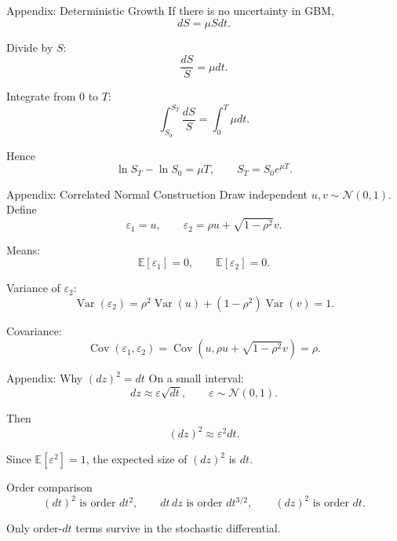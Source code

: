 \documentclass[aspectratio=169,11pt]{beamer}
\newcommand{\eps}{\varepsilon}
\newcommand{\E}{\mathbb{E}}
\newcommand{\Var}{\operatorname{Var}}
\newcommand{\Cov}{\operatorname{Cov}}
\newcommand{\Normal}{\mathcal{N}}
\begin{document}
\begin{frame}[label=deriv_gbm_no_uncertainty]{Appendix: Deterministic Growth}
    If there is no uncertainty in GBM,
    \[
        dS=\mu Sdt.
    \]

    Divide by \(S\):
    \[
        \frac{dS}{S}=\mu dt.
    \]

    Integrate from 0 to \(T\):
    \[
        \int_{S_0}^{S_T}\frac{dS}{S}
        =
        \int_0^T \mu dt.
    \]

    Hence
    \[
        \ln S_T-\ln S_0=\mu T,
        \qquad
        S_T=S_0e^{\mu T}.
    \]

    \hyperlink{gbm_main}{}
\end{frame}

\begin{frame}[label=deriv_correlated_normals]{Appendix: Correlated Normal Construction}
    Draw independent \(u,v\sim\Normal(0,1)\). Define
    \[
        \eps_1=u,
        \qquad
        \eps_2=\rho u+\sqrt{1-\rho^2}v.
    \]

    Means:
    \[
        \E[\eps_1]=0,
        \qquad
        \E[\eps_2]=0.
    \]

    Variance of \(\eps_2\):
    \[
        \Var(\eps_2)=\rho^2\Var(u)+(1-\rho^2)\Var(v)=1.
    \]

    Covariance:
    \[
        \Cov(\eps_1,\eps_2)
        =
        \Cov(u,\rho u+\sqrt{1-\rho^2}v)
        =
        \rho.
    \]

    \hyperlink{correlation_main}{}
\end{frame}

\begin{frame}[label=deriv_quadratic_variation]{Appendix: Why \((dz)^2=dt\)}
    On a small interval:
    \[
        dz\approx \eps\sqrt{dt},
        \qquad
        \eps\sim\Normal(0,1).
    \]

    Then
    \[
        (dz)^2\approx \eps^2dt.
    \]

    Since \(\E[\eps^2]=1\), the expected size of \((dz)^2\) is \(dt\).

    \begin{block}{Order comparison}
        \[
            (dt)^2 \text{ is order } dt^2,
            \qquad
            dt\,dz \text{ is order } dt^{3/2},
            \qquad
            (dz)^2 \text{ is order } dt.
        \]
    \end{block}

    Only order-\(dt\) terms survive in the stochastic differential.

    \hyperlink{quadvar_main}{}
\end{frame}
\end{document}
